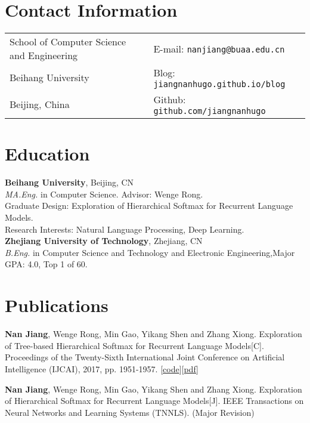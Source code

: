 \documentclass[margin,line]{resume}
\begin{document}

\begin{resume}
\section{Contact Information}
\begin{tabular}{@{}p{3.5in}p{3.5in}}
School of Computer Science and Engineering & { E-mail:}  {\tt nanjiang@buaa.edu.cn} \\
Beihang University                         & { Blog:} {\tt jiangnanhugo.github.io/blog} \\
Beijing, China                             & { Github:} {\tt github.com/jiangnanhugo} \\
\end{tabular}


\section{Education}
{\bf Beihang University}, Beijing,  CN\\
\emph{MA.Eng.} in Computer Science. Advisor: Wenge Rong.\\
Graduate Design: Exploration of Hierarchical Softmax for Recurrent Language Models. \\
Research Interests: Natural Language Processing, Deep Learning. \\

{\bf Zhejiang University of Technology}, Zhejiang, CN\\
\emph{B.Eng.} in Computer Science and Technology and Electronic Engineering,\space Major GPA: 4.0, Top 1 of 60.


\section{Publications}
\textbf{Nan Jiang}, Wenge Rong, Min Gao, Yikang Shen and Zhang Xiong. Exploration of Tree-based Hierarchical Softmax for Recurrent Language Models[C]. Proceedings of the Twenty-Sixth International Joint Conference on Artificial Intelligence (IJCAI), 2017, pp. 1951-1957. [\href{https://github.com/jiangnanHugo/lmkit}{code}][\href{https://www.ijcai.org/proceedings/2017/0271.pdf}{pdf}]

\textbf{Nan Jiang}, Wenge Rong, Min Gao, Yikang Shen and Zhang Xiong. Exploration of Hierarchical Softmax for Recurrent Language Models[J]. IEEE Transactions on Neural Networks and Learning Systems (TNNLS). (Major Revision)


\end{resume}
\end{document}
